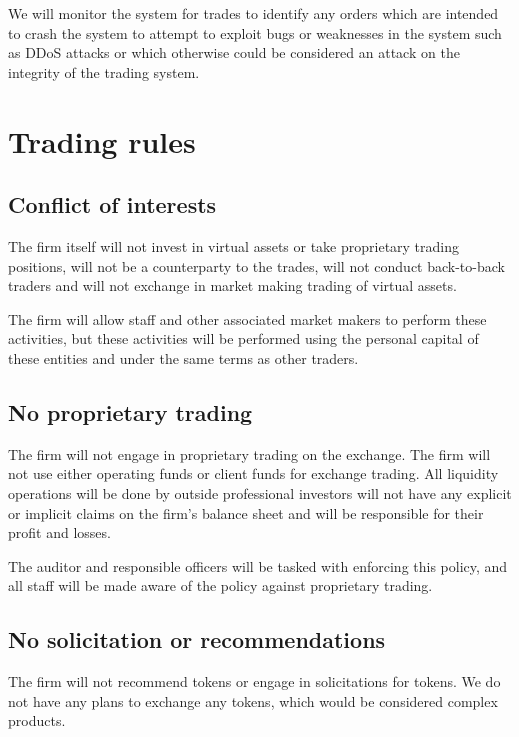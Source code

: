 We will monitor the system for trades to identify any orders which are
intended to crash the system to attempt to exploit bugs or weaknesses
in the system such as DDoS attacks or which otherwise could be considered an
attack on the integrity of the trading system.

\section{Trading rules}

\subsection{Conflict of interests}
The firm itself will not invest in virtual assets or take proprietary
trading positions, will not be a counterparty to the trades, will not
conduct back-to-back traders and will not exchange in market making
trading of virtual assets.

The firm will allow staff and other associated market makers to
perform these activities, but these activities will be performed using
the personal capital of these entities and under the same terms as
other traders.

\subsection{No proprietary trading}

The firm will not engage in proprietary trading on the exchange.  The firm will not use either operating funds or client funds for exchange
trading.  All liquidity operations will be done by outside
professional investors will not have any explicit or implicit claims
on the firm's balance sheet and will be responsible for their
profit and losses.

The auditor and responsible officers will be tasked with enforcing
this policy, and all staff will be made aware of the policy against
proprietary trading.

\subsection{No solicitation or recommendations}
The firm will not recommend tokens or engage in solicitations for
tokens.  We do not have any plans to exchange any tokens, which would
be considered complex products.

